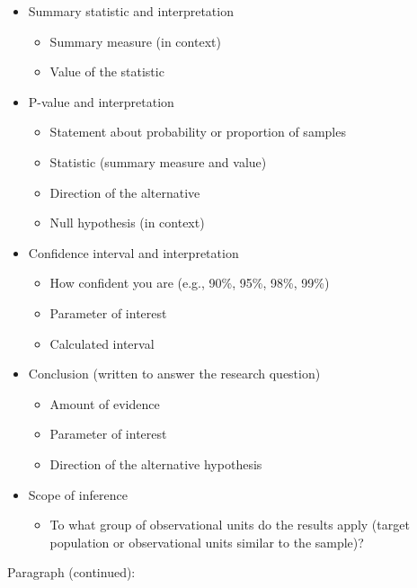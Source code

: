 \documentclass[
]{report}
\providecommand{\tightlist}{%
  \setlength{\itemsep}{0pt}\setlength{\parskip}{0pt}}
\begin{document}
\begin{itemize}
\item
  Summary statistic and interpretation

  \begin{itemize}
  \item
    Summary measure (in context)
  \item
    Value of the statistic
  \end{itemize}
\item
  P-value and interpretation

  \begin{itemize}
  \item
    Statement about probability or proportion of samples
  \item
    Statistic (summary measure and value)
  \item
    Direction of the alternative
  \item
    Null hypothesis (in context)
  \end{itemize}
\item
  Confidence interval and interpretation

  \begin{itemize}
  \item
    How confident you are (e.g., 90\%, 95\%, 98\%, 99\%)
  \item
    Parameter of interest
  \item
    Calculated interval
  \end{itemize}
\item
  Conclusion (written to answer the research question)

  \begin{itemize}
  \item
    Amount of evidence
  \item
    Parameter of interest
  \item
    Direction of the alternative hypothesis
  \end{itemize}
\item
  Scope of inference

  \begin{itemize}
  \tightlist
  \item
    To what group of observational units do the results apply (target population or observational units similar to the sample)?
  \end{itemize}
\end{itemize}

\newpage

Paragraph (continued):
\end{document}
